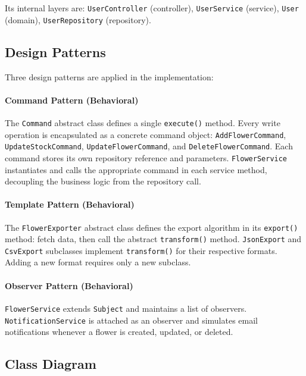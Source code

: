 \par Its internal layers are: \texttt{UserController} (controller), \texttt{UserService} (service), \texttt{User} (domain), \texttt{UserRepository} (repository).

\subsection{Design Patterns}

\par Three design patterns are applied in the implementation:

\paragraph{Command Pattern (Behavioral)}
\par The \texttt{Command} abstract class defines a single \texttt{execute()} method. Every write operation is encapsulated as a concrete command object: \texttt{AddFlowerCommand}, \texttt{UpdateStockCommand}, \texttt{UpdateFlowerCommand}, and \texttt{DeleteFlowerCommand}. Each command stores its own repository reference and parameters. \texttt{FlowerService} instantiates and calls the appropriate command in each service method, decoupling the business logic from the repository call.

\paragraph{Template Pattern (Behavioral)}
\par The \texttt{FlowerExporter} abstract class defines the export algorithm in its \texttt{export()} method: fetch data, then call the abstract \texttt{transform()} method. \texttt{JsonExport} and \texttt{CsvExport} subclasses implement \texttt{transform()} for their respective formats. Adding a new format requires only a new subclass.

\paragraph{Observer Pattern (Behavioral)}
\par \texttt{FlowerService} extends \texttt{Subject} and maintains a list of observers. \texttt{NotificationService} is attached as an observer and simulates email notifications whenever a flower is created, updated, or deleted.

\subsection{Class Diagram}

